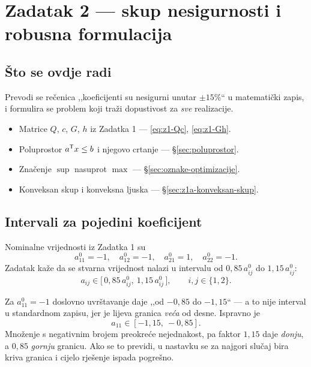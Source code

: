 \chapter{Zadatak 2 --- skup nesigurnosti i robusna formulacija}
\label{ch:z2-nesigurnost}

\section{Što se ovdje radi}

Prevodi se rečenica ,,koeficijenti su nesigurni unutar $\pm15\%$`` u matematički
zapis, i formulira se problem koji traži dopustivost za \emph{sve} realizacije.

\begin{predznanje}
\begin{itemize}[nosep,leftmargin=*]
  \item Matrice $Q$, $c$, $G$, $h$ iz Zadatka 1 --- \eqref{eq:z1-Qc}, \eqref{eq:z1-Gh}.
  \item Poluprostor $a^{\mathsf{T}} x \leq b$ i njegovo crtanje --- \S\ref{sec:poluprostor}.
  \item Značenje $\sup$ nasuprot $\max$ --- \S\ref{sec:oznake-optimizacije}.
  \item Konveksan skup i konveksna ljuska --- \S\ref{sec:z1a-konveksan-skup}.
\end{itemize}
\end{predznanje}

\section{Intervali za pojedini koeficijent}
\label{sec:z2-intervali}

Nominalne vrijednosti iz Zadatka 1 su
\begin{equation}
a_{11}^{0} = -1, \quad a_{12}^{0} = -1, \quad a_{21}^{0} = 1, \quad a_{22}^{0} = -1 .
\end{equation}
Zadatak kaže da se stvarna vrijednost nalazi u intervalu od $0{,}85\,a_{ij}^{0}$
do $1{,}15\,a_{ij}^{0}$:
\begin{equation}
a_{ij} \in \bigl[\,0{,}85\,a_{ij}^{0},\ 1{,}15\,a_{ij}^{0}\,\bigr],
\qquad i,j \in \{1,2\}.
\label{eq:z2-interval}
\end{equation}

\begin{zamka}
Za $a_{11}^{0} = -1$ doslovno uvrštavanje daje ,,od $-0{,}85$ do $-1{,}15$`` ---
a to nije interval u standardnom zapisu, jer je lijeva granica \emph{veća} od
desne. Ispravno je
\[
a_{11} \in [-1{,}15,\ -0{,}85].
\]
Množenje s negativnim brojem preokreće nejednakost, pa faktor $1{,}15$ daje
\emph{donju}, a $0{,}85$ \emph{gornju} granicu. Ako se to previdi, u nastavku se
za najgori slučaj bira kriva granica i cijelo rješenje ispada pogrešno.
\end{zamka}

